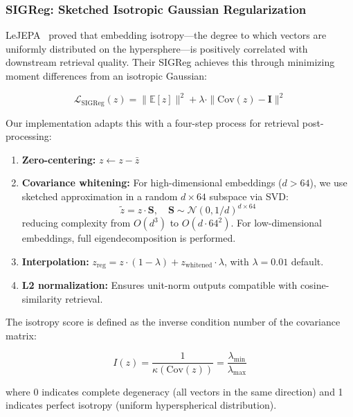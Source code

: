 \documentclass[11pt,a4paper]{article}
\begin{document}
\subsubsection{SIGReg: Sketched Isotropic Gaussian Regularization}

LeJEPA~\cite{lejepa2025} proved that embedding isotropy---the degree to which vectors are uniformly distributed on the hypersphere---is positively correlated with downstream retrieval quality. Their SIGReg achieves this through minimizing moment differences from an isotropic Gaussian:

\begin{equation}
\mathcal{L}_{\text{SIGReg}}(z) = \|\mathbb{E}[z]\|^2 + \lambda \cdot \|\text{Cov}(z) - \mathbf{I}\|^2
\label{eq:sigreg_loss}
\end{equation}

Our implementation adapts this with a four-step process for retrieval post-processing:

\begin{enumerate}[leftmargin=*,itemsep=2pt]
    \item \textbf{Zero-centering:} \(z \leftarrow z - \bar{z}\)
    \item \textbf{Covariance whitening:} For high-dimensional embeddings (\(d > 64\)), we use sketched approximation in a random \(d \times 64\) subspace via SVD:
    \begin{equation}
    \tilde{z} = z \cdot \mathbf{S}, \quad \mathbf{S} \sim \mathcal{N}(0, 1/d)^{d \times 64}
    \end{equation}
    reducing complexity from \(O(d^3)\) to \(O(d \cdot 64^2)\). For low-dimensional embeddings, full eigendecomposition is performed.
    \item \textbf{Interpolation:} \(z_{\text{reg}} = z \cdot (1 - \lambda) + z_{\text{whitened}} \cdot \lambda\), with \(\lambda = 0.01\) default.
    \item \textbf{L2 normalization:} Ensures unit-norm outputs compatible with cosine-similarity retrieval.
\end{enumerate}

The isotropy score is defined as the inverse condition number of the covariance matrix:

\begin{equation}
I(z) = \frac{1}{\kappa(\text{Cov}(z))} = \frac{\lambda_{\min}}{\lambda_{\max}}
\label{eq:isotropy}
\end{equation}

where 0 indicates complete degeneracy (all vectors in the same direction) and 1 indicates perfect isotropy (uniform hyperspherical distribution).
\end{document}
